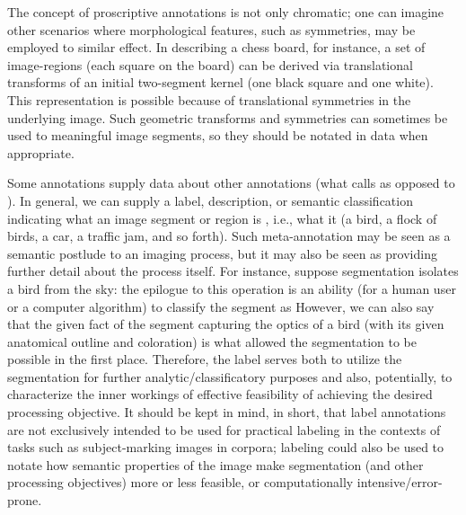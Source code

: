 {\begin{description}
The concept of proscriptive annotations is not 
only chromatic; one can imagine other scenarios 
where morphological features, such as symmetries, 
may be employed to similar effect.  In describing 
a chess board, for instance, a set of image-regions 
(each square on the board) can be derived 
via translational transforms of an initial 
two-segment kernel (one black square and one white).  
This representation is possible because of 
translational symmetries in the underlying image.  
Such geometric transforms and symmetries can 
sometimes be used to  meaningful 
image segments, so they should be notated 
in \AXFI{} data when appropriate.  

\item[Semantic Labels]  Some annotations supply data 
about other annotations (what \AIM{} calls 
 as opposed to 
).  In general, we 
can supply a label, description, or semantic 
classification indicating what an image segment 
or region is , i.e., what it  
(a bird, a flock of birds, a car, a traffic 
jam, and so forth).  Such meta-annotation may be 
seen as a semantic postlude to an imaging  
process, but it may also be seen as providing further 
detail about the process itself.  For instance, 
suppose segmentation isolates a bird from the 
sky: the epilogue to this operation is an ability 
(for a human user or a computer algorithm) to 
classify the segment as   However, we 
can also say that the given fact of the segment 
capturing the optics of a bird (with its given 
anatomical outline and coloration) is what 
allowed the segmentation to be possible in the 
first place.  Therefore, the label  
serves both to utilize the segmentation for 
further analytic/classificatory purposes and 
also, potentially, to characterize the 
inner workings of effective feasibility of 
achieving the desired processing objective.  
It should be kept in mind, in short, that 
label annotations are not exclusively 
intended to be used for practical labeling 
in the contexts of tasks such as subject-marking 
images in corpora; labeling could also 
be used to notate how semantic properties 
of the image make segmentation (and other 
processing objectives) more or less 
feasible, or computationally intensive/error-prone. 


\end{description}}

